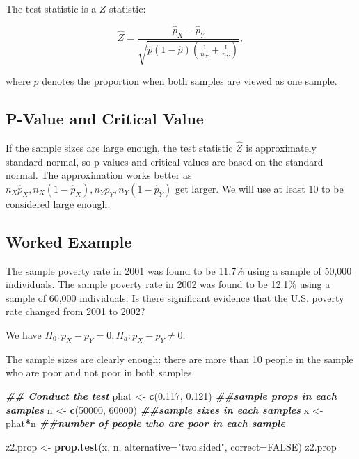 \documentclass[
]{book}
\newenvironment{Shaded}{\begin{snugshade}}{\end{snugshade}}
\newcommand{\AttributeTok}[1]{\textcolor[rgb]{0.13,0.29,0.53}{#1}}
\newcommand{\ConstantTok}[1]{\textcolor[rgb]{0.56,0.35,0.01}{#1}}
\newcommand{\DecValTok}[1]{\textcolor[rgb]{0.00,0.00,0.81}{#1}}
\newcommand{\DocumentationTok}[1]{\textcolor[rgb]{0.56,0.35,0.01}{\textbf{\textit{#1}}}}
\newcommand{\FloatTok}[1]{\textcolor[rgb]{0.00,0.00,0.81}{#1}}
\newcommand{\FunctionTok}[1]{\textcolor[rgb]{0.13,0.29,0.53}{\textbf{#1}}}
\newcommand{\NormalTok}[1]{#1}
\newcommand{\OtherTok}[1]{\textcolor[rgb]{0.56,0.35,0.01}{#1}}
\newcommand{\SpecialCharTok}[1]{\textcolor[rgb]{0.81,0.36,0.00}{\textbf{#1}}}
\newcommand{\StringTok}[1]{\textcolor[rgb]{0.31,0.60,0.02}{#1}}
\theoremstyle{definition}
\theoremstyle{definition}
\theoremstyle{definition}
\theoremstyle{definition}
\theoremstyle{remark}
\begin{document}
The test statistic is a \(Z\) statistic:

\begin{equation} 
\hat{Z} =  \frac{\hat{p}_X - \hat{p}_Y}{\sqrt{\hat{p}(1 - \hat{p})(\frac{1}{n_X} + \frac{1}{n_Y})}},
\label{eq:teststat2Prop}
\end{equation}

where \(\hat{p}\) denotes the proportion when both samples are viewed as one sample.

\hypertarget{p-value-and-critical-value-3}{%
\subsection{P-Value and Critical Value}\label{p-value-and-critical-value-3}}

If the sample sizes are large enough, the test statistic \(\hat{Z}\) is approximately standard normal, so p-values and critical values are based on the standard normal. The approximation works better as \(n_X \hat{p}_X, n_X (1-\hat{p}_X), n_Y \hat{p}_Y, n_Y (1-\hat{p}_Y)\) get larger. We will use at least 10 to be considered large enough.

\hypertarget{worked-example-10}{%
\subsection{Worked Example}\label{worked-example-10}}

The sample poverty rate in 2001 was found to be 11.7\% using a sample of 50,000 individuals. The sample poverty rate in 2002 was found to be 12.1\% using a sample of 60,000 individuals. Is there significant evidence that the U.S. poverty rate changed from 2001 to 2002?

We have \(H_0: p_X - p_Y = 0, H_a: p_X - p_Y \neq 0\).

The sample sizes are clearly enough: there are more than 10 people in the sample who are poor and not poor in both samples.

\begin{Shaded}
\begin{Highlighting}[]
\DocumentationTok{\#\# Conduct the test}
\NormalTok{phat }\OtherTok{\textless{}{-}} \FunctionTok{c}\NormalTok{(}\FloatTok{0.117}\NormalTok{, }\FloatTok{0.121}\NormalTok{) }\DocumentationTok{\#\#sample props in each samples}
\NormalTok{n }\OtherTok{\textless{}{-}} \FunctionTok{c}\NormalTok{(}\DecValTok{50000}\NormalTok{, }\DecValTok{60000}\NormalTok{) }\DocumentationTok{\#\#sample sizes in each samples}
\NormalTok{x }\OtherTok{\textless{}{-}}\NormalTok{ phat}\SpecialCharTok{*}\NormalTok{n }\DocumentationTok{\#\#number of people who are poor in each sample}

\NormalTok{z2.prop }\OtherTok{\textless{}{-}} \FunctionTok{prop.test}\NormalTok{(x, n, }\AttributeTok{alternative=}\StringTok{"two.sided"}\NormalTok{, }\AttributeTok{correct=}\ConstantTok{FALSE}\NormalTok{)}
\NormalTok{z2.prop}
\end{Highlighting}
\end{Shaded}
\end{document}
